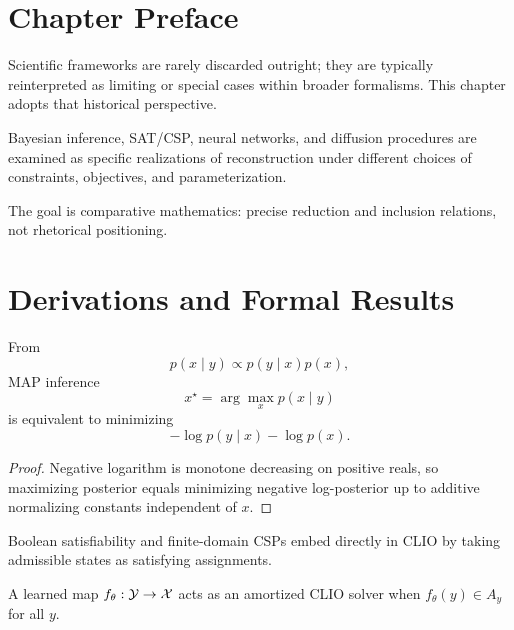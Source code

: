 \section{Chapter Preface}
Scientific frameworks are rarely discarded outright; they are typically reinterpreted as limiting or special cases within broader formalisms. This chapter adopts that historical perspective.

Bayesian inference, SAT/CSP, neural networks, and diffusion procedures are examined as specific realizations of reconstruction under different choices of constraints, objectives, and parameterization.

The goal is comparative mathematics: precise reduction and inclusion relations, not rhetorical positioning.

\section{Derivations and Formal Results}

\begin{proposition}
From
\[
p(x\mid y)\propto p(y\mid x)p(x),
\]
MAP inference
\[
x^\star=\arg\max_x p(x\mid y)
\]
is equivalent to minimizing
\[
-\log p(y\mid x)-\log p(x).
\]
\end{proposition}

\begin{proof}
Negative logarithm is monotone decreasing on positive reals, so maximizing posterior equals minimizing negative log-posterior up to additive normalizing constants independent of \(x\).
\end{proof}

\begin{proposition}
Boolean satisfiability and finite-domain CSPs embed directly in CLIO by taking admissible states as satisfying assignments.
\end{proposition}

\begin{proposition}
A learned map \(f_\theta:\mathcal{Y}\to\mathcal{X}\) acts as an amortized CLIO solver when \(f_\theta(y)\in A_y\) for all \(y\).
\end{proposition}
